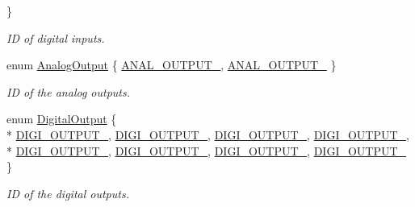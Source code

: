 \begin{DoxyCompactItemize}
 \}
\begin{DoxyCompactList}\small\item\em I\-D of digital inputs. \end{DoxyCompactList}\item 
enum \hyperlink{classhbs_1_1_p_v_m110_n_acad2215726715b9d47760b291f49e45b}{Analog\-Output} \{ \hyperlink{classhbs_1_1_p_v_m110_n_acad2215726715b9d47760b291f49e45ba8e1eb378417fc2859a5ac98dd10cb057}{A\-N\-A\-L\-\_\-\-O\-U\-T\-P\-U\-T\-\_}, 
\hyperlink{classhbs_1_1_p_v_m110_n_acad2215726715b9d47760b291f49e45baf078f4669c342156776f6c068e198e37}{A\-N\-A\-L\-\_\-\-O\-U\-T\-P\-U\-T\-\_}
 \}
\begin{DoxyCompactList}\small\item\em I\-D of the analog outputs. \end{DoxyCompactList}\item 
enum \hyperlink{classhbs_1_1_p_v_m110_n_a5465effcd4a5984d51ff2cabaeb7d228}{Digital\-Output} \{ \\*
\hyperlink{classhbs_1_1_p_v_m110_n_a5465effcd4a5984d51ff2cabaeb7d228a0cfd060fe7097539f31b86eea19f2c97}{D\-I\-G\-I\-\_\-\-O\-U\-T\-P\-U\-T\-\_}, 
\hyperlink{classhbs_1_1_p_v_m110_n_a5465effcd4a5984d51ff2cabaeb7d228aaa798ee0f818759782c03a0fb3217d15}{D\-I\-G\-I\-\_\-\-O\-U\-T\-P\-U\-T\-\_}, 
\hyperlink{classhbs_1_1_p_v_m110_n_a5465effcd4a5984d51ff2cabaeb7d228a339c63f156a5f1e650744d9226764983}{D\-I\-G\-I\-\_\-\-O\-U\-T\-P\-U\-T\-\_}, 
\hyperlink{classhbs_1_1_p_v_m110_n_a5465effcd4a5984d51ff2cabaeb7d228a5e58a17bbfb32e92a7e0f39c36004d69}{D\-I\-G\-I\-\_\-\-O\-U\-T\-P\-U\-T\-\_}, 
\\*
\hyperlink{classhbs_1_1_p_v_m110_n_a5465effcd4a5984d51ff2cabaeb7d228a9acb22636f03d6c5a0e9e2ac36d49a43}{D\-I\-G\-I\-\_\-\-O\-U\-T\-P\-U\-T\-\_}, 
\hyperlink{classhbs_1_1_p_v_m110_n_a5465effcd4a5984d51ff2cabaeb7d228a720f6edd6433d368a857117d9141ffc9}{D\-I\-G\-I\-\_\-\-O\-U\-T\-P\-U\-T\-\_}, 
\hyperlink{classhbs_1_1_p_v_m110_n_a5465effcd4a5984d51ff2cabaeb7d228a96d3d567aed25d95c8cfb0a62f4ec941}{D\-I\-G\-I\-\_\-\-O\-U\-T\-P\-U\-T\-\_}, 
\hyperlink{classhbs_1_1_p_v_m110_n_a5465effcd4a5984d51ff2cabaeb7d228a692d8b3813505f4e3615da9baf4cfde5}{D\-I\-G\-I\-\_\-\-O\-U\-T\-P\-U\-T\-\_}
 \}
\begin{DoxyCompactList}\small\item\em I\-D of the digital outputs. \end{DoxyCompactList}\end{DoxyCompactItemize}
